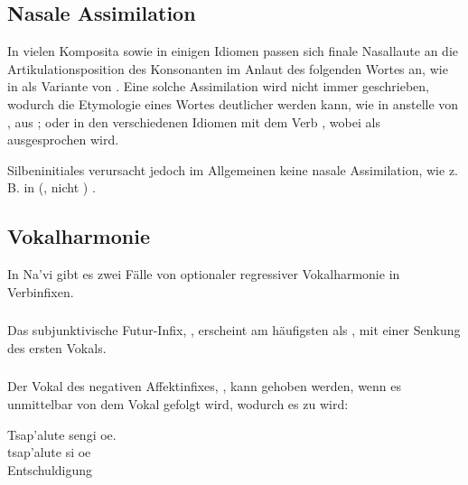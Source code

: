 \subsection{Nasale Assimilation} In vielen Komposita sowie in einigen Idiomen passen sich finale Nasallaute an die Artikulationsposition des Konsonanten im Anlaut des folgenden Wortes an, wie in  als Variante von . Eine solche Assimilation wird nicht immer geschrieben, wodurch die Etymologie eines Wortes deutlicher werden kann, wie in  anstelle von , aus ; oder in den verschiedenen Idiomen mit dem Verb  , wobei  als  ausgesprochen wird.  \label{lands:nasalassim}

Silbeninitiales  verursacht jedoch im Allgemeinen keine nasale Assimilation, wie z. B. in  (, nicht ) .

\subsection{Vokalharmonie} In Na'vi gibt es zwei Fälle von optionaler regressiver Vokalharmonie in Verbinfixen.

\subsubsection{} Das subjunktivische Futur-Infix, , erscheint am häufigsten als , mit einer Senkung des ersten Vokals.

\subsubsection{}\label{lands:eng}
Der Vokal des negativen Affektinfixes, , kann gehoben werden, wenn es unmittelbar von dem Vokal  gefolgt wird, wodurch es zu  wird:

\begin{interlin}
	\glll Tsap'alute sengi oe. \\
	tsap'alute si oe \\
	Entschuldigung   \\
\end{interlin}


